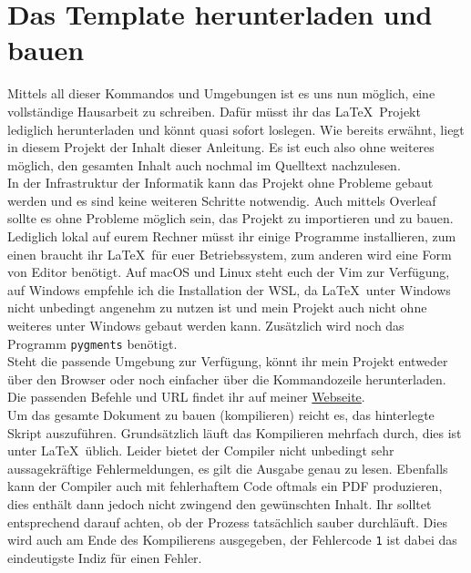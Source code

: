 \section{Das Template herunterladen und bauen}

Mittels all dieser Kommandos und Umgebungen ist es uns nun möglich, eine
vollständige Hausarbeit zu schreiben. Dafür müsst ihr das \LaTeX~Projekt 
lediglich herunterladen und könnt quasi sofort loslegen. Wie bereits erwähnt,
liegt in diesem Projekt der Inhalt dieser Anleitung. Es ist euch also ohne 
weiteres möglich, den gesamten Inhalt auch nochmal im Quelltext nachzulesen.\\
In der Infrastruktur der Informatik kann das Projekt ohne Probleme gebaut 
werden und es sind keine weiteren Schritte notwendig. Auch mittels Overleaf
sollte es ohne Probleme möglich sein, das Projekt zu importieren und zu bauen. 
Lediglich lokal auf eurem Rechner müsst ihr einige Programme installieren, zum 
einen braucht ihr \LaTeX~für euer Betriebssystem, zum anderen wird eine Form 
von Editor benötigt. Auf macOS und Linux steht euch der Vim zur Verfügung, auf
Windows empfehle ich die Installation der WSL, da \LaTeX~unter Windows nicht 
unbedingt angenehm zu nutzen ist und mein Projekt auch nicht ohne weiteres unter
Windows gebaut werden kann. Zusätzlich wird noch das Programm \texttt{pygments} 
benötigt.\\
Steht die passende Umgebung zur Verfügung, könnt ihr mein Projekt entweder über 
den Browser oder noch einfacher über die Kommandozeile herunterladen. Die passenden
Befehle und URL findet ihr auf meiner 
\href{https://informatik.hs-bremerhaven.de/flignitz/latex.html}{Webseite}.\\
Um das gesamte Dokument zu bauen (kompilieren) reicht es, das hinterlegte Skript
auszuführen. Grundsätzlich läuft das Kompilieren mehrfach durch, dies ist unter 
\LaTeX~üblich. Leider bietet der Compiler nicht unbedingt sehr aussagekräftige 
Fehlermeldungen, es gilt die Ausgabe genau zu lesen. Ebenfalls kann der Compiler auch
mit fehlerhaftem Code oftmals ein PDF produzieren, dies enthält dann jedoch nicht 
zwingend den gewünschten Inhalt. Ihr solltet entsprechend darauf achten, ob der 
Prozess tatsächlich sauber durchläuft. Dies wird auch am Ende des Kompilierens 
ausgegeben, der Fehlercode \texttt{1} ist dabei das eindeutigste Indiz für einen
Fehler.
